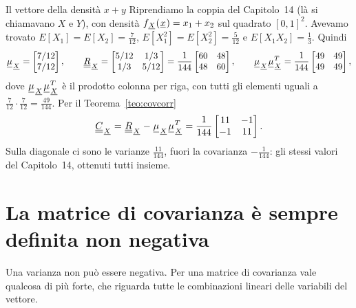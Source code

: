 \begin{esempio}{Il vettore della densità $x + y$}
Riprendiamo la coppia del Capitolo~14 (là si chiamavano $X$ e $Y$), con densità $f_{{\mkern1mu\underline{X}\mkern1mu}}({\mkern1mu\underline{x}\mkern1mu}) = x_1 + x_2$ sul
quadrato $[0, 1]^2$. Avevamo trovato $E[X_1] = E[X_2] = \frac{7}{12}$, $E[X_1^2] = E[X_2^2] = \frac{5}{12}$ e
$E[X_1 X_2] = \frac13$. Quindi
\[ {\mkern1mu\underline{\mu}\mkern1mu}_{{\mkern1mu\underline{X}\mkern1mu}} = \begin{bmatrix} 7/12 \\ 7/12 \end{bmatrix} , \qquad
   {\mkern1mu\underline{\underline{R}}\mkern1mu}_{{\mkern1mu\underline{X}\mkern1mu}} = \begin{bmatrix} 5/12 & 1/3 \\ 1/3 & 5/12 \end{bmatrix} = \frac{1}{144} \begin{bmatrix} 60 & 48
   \\ 48 & 60 \end{bmatrix} , \qquad
   {\mkern1mu\underline{\mu}\mkern1mu}_{{\mkern1mu\underline{X}\mkern1mu}} {\mkern1mu\underline{\mu}\mkern1mu}_{{\mkern1mu\underline{X}\mkern1mu}}^T = \frac{1}{144} \begin{bmatrix} 49 & 49 \\ 49 & 49 \end{bmatrix} , \]
dove ${\mkern1mu\underline{\mu}\mkern1mu}_{{\mkern1mu\underline{X}\mkern1mu}} {\mkern1mu\underline{\mu}\mkern1mu}_{{\mkern1mu\underline{X}\mkern1mu}}^T$ è il prodotto colonna per riga, con tutti gli elementi uguali a
$\frac{7}{12} \cdot \frac{7}{12} = \frac{49}{144}$. Per il Teorema~\ref{teo:covcorr}
\[ {\mkern1mu\underline{\underline{C}}\mkern1mu}_{{\mkern1mu\underline{X}\mkern1mu}} = {\mkern1mu\underline{\underline{R}}\mkern1mu}_{{\mkern1mu\underline{X}\mkern1mu}} - {\mkern1mu\underline{\mu}\mkern1mu}_{{\mkern1mu\underline{X}\mkern1mu}} {\mkern1mu\underline{\mu}\mkern1mu}_{{\mkern1mu\underline{X}\mkern1mu}}^T = \frac{1}{144}
   \begin{bmatrix} 11 & -1 \\ -1 & 11 \end{bmatrix} . \]
Sulla diagonale ci sono le varianze $\frac{11}{144}$, fuori la covarianza $-\frac{1}{144}$: gli stessi valori del
Capitolo~14, ottenuti tutti insieme.
\end{esempio}

\section{La matrice di covarianza è sempre definita non negativa}

Una varianza non può essere negativa. Per una matrice di covarianza vale qualcosa di più forte, che riguarda tutte le
combinazioni lineari delle variabili del vettore.


